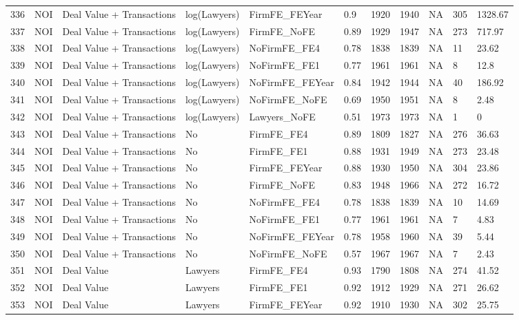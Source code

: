 \begin{table}[ht]
\begin{tabular}{rllllllllll}
  336 & NOI & Deal Value + Transactions & log(Lawyers) & FirmFE\_FEYear & 0.9 & 1920 & 1940 & NA & 305 & 1328.67 \\ 
  337 & NOI & Deal Value + Transactions & log(Lawyers) & FirmFE\_NoFE & 0.89 & 1929 & 1947 & NA & 273 & 717.97 \\ 
  338 & NOI & Deal Value + Transactions & log(Lawyers) & NoFirmFE\_FE4 & 0.78 & 1838 & 1839 & NA & 11 & 23.62 \\ 
  339 & NOI & Deal Value + Transactions & log(Lawyers) & NoFirmFE\_FE1 & 0.77 & 1961 & 1961 & NA & 8 & 12.8 \\ 
  340 & NOI & Deal Value + Transactions & log(Lawyers) & NoFirmFE\_FEYear & 0.84 & 1942 & 1944 & NA & 40 & 186.92 \\ 
  341 & NOI & Deal Value + Transactions & log(Lawyers) & NoFirmFE\_NoFE & 0.69 & 1950 & 1951 & NA & 8 & 2.48 \\ 
  342 & NOI & Deal Value + Transactions & log(Lawyers) & Lawyers\_NoFE & 0.51 & 1973 & 1973 & NA & 1 & 0 \\ 
  343 & NOI & Deal Value + Transactions & No & FirmFE\_FE4 & 0.89 & 1809 & 1827 & NA & 276 & 36.63 \\ 
  344 & NOI & Deal Value + Transactions & No & FirmFE\_FE1 & 0.88 & 1931 & 1949 & NA & 273 & 23.48 \\ 
  345 & NOI & Deal Value + Transactions & No & FirmFE\_FEYear & 0.88 & 1930 & 1950 & NA & 304 & 23.86 \\ 
  346 & NOI & Deal Value + Transactions & No & FirmFE\_NoFE & 0.83 & 1948 & 1966 & NA & 272 & 16.72 \\ 
  347 & NOI & Deal Value + Transactions & No & NoFirmFE\_FE4 & 0.78 & 1838 & 1839 & NA & 10 & 14.69 \\ 
  348 & NOI & Deal Value + Transactions & No & NoFirmFE\_FE1 & 0.77 & 1961 & 1961 & NA & 7 & 4.83 \\ 
  349 & NOI & Deal Value + Transactions & No & NoFirmFE\_FEYear & 0.78 & 1958 & 1960 & NA & 39 & 5.44 \\ 
  350 & NOI & Deal Value + Transactions & No & NoFirmFE\_NoFE & 0.57 & 1967 & 1967 & NA & 7 & 2.43 \\ 
  351 & NOI & Deal Value & Lawyers & FirmFE\_FE4 & 0.93 & 1790 & 1808 & NA & 274 & 41.52 \\ 
  352 & NOI & Deal Value & Lawyers & FirmFE\_FE1 & 0.92 & 1912 & 1929 & NA & 271 & 26.62 \\ 
  353 & NOI & Deal Value & Lawyers & FirmFE\_FEYear & 0.92 & 1910 & 1930 & NA & 302 & 25.75 \\ 

\end{tabular}
\end{table}
